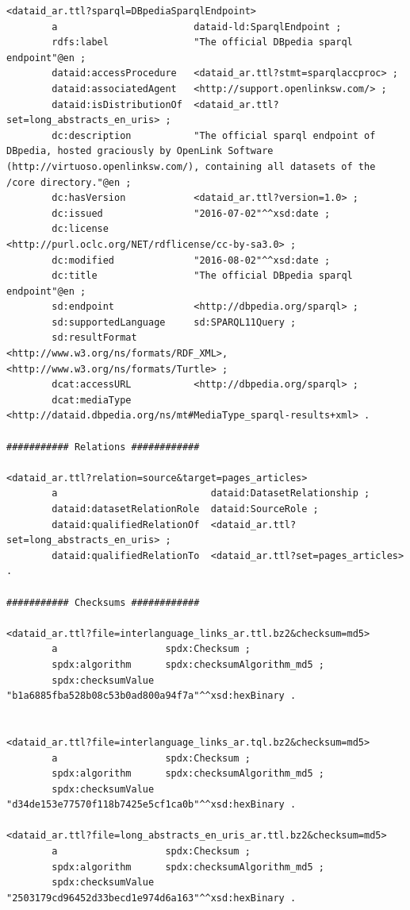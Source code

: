 \documentclass[a4paper,english,twoside,BCOR1.5cm,headsepline,DIV12,appendixprefix,final,12pt]{scrbook}
\begin{document}
\begin{lstlisting}[language=ttl, captionpos=b, label=lst:dcex,linewidth=\columnwidth,breaklines=true,basicstyle=\ttfamily\scriptsize]
<dataid_ar.ttl?sparql=DBpediaSparqlEndpoint>
        a                        dataid-ld:SparqlEndpoint ;
        rdfs:label               "The official DBpedia sparql endpoint"@en ;
        dataid:accessProcedure   <dataid_ar.ttl?stmt=sparqlaccproc> ;
        dataid:associatedAgent   <http://support.openlinksw.com/> ;
        dataid:isDistributionOf  <dataid_ar.ttl?set=long_abstracts_en_uris> ;
        dc:description           "The official sparql endpoint of DBpedia, hosted graciously by OpenLink Software (http://virtuoso.openlinksw.com/), containing all datasets of the /core directory."@en ;
        dc:hasVersion            <dataid_ar.ttl?version=1.0> ;
        dc:issued                "2016-07-02"^^xsd:date ;
        dc:license               <http://purl.oclc.org/NET/rdflicense/cc-by-sa3.0> ;
        dc:modified              "2016-08-02"^^xsd:date ;
        dc:title                 "The official DBpedia sparql endpoint"@en ;
        sd:endpoint				 <http://dbpedia.org/sparql> ;
        sd:supportedLanguage	 sd:SPARQL11Query ;
        sd:resultFormat			 <http://www.w3.org/ns/formats/RDF_XML>, <http://www.w3.org/ns/formats/Turtle> ;
        dcat:accessURL           <http://dbpedia.org/sparql> ;
        dcat:mediaType           <http://dataid.dbpedia.org/ns/mt#MediaType_sparql-results+xml> .
        
########### Relations ############

<dataid_ar.ttl?relation=source&target=pages_articles>
        a                           dataid:DatasetRelationship ;
        dataid:datasetRelationRole  dataid:SourceRole ;
        dataid:qualifiedRelationOf  <dataid_ar.ttl?set=long_abstracts_en_uris> ;
        dataid:qualifiedRelationTo  <dataid_ar.ttl?set=pages_articles> .

########### Checksums ############

<dataid_ar.ttl?file=interlanguage_links_ar.ttl.bz2&checksum=md5>
        a                   spdx:Checksum ;
        spdx:algorithm      spdx:checksumAlgorithm_md5 ;
        spdx:checksumValue  "b1a6885fba528b08c53b0ad800a94f7a"^^xsd:hexBinary .


<dataid_ar.ttl?file=interlanguage_links_ar.tql.bz2&checksum=md5>
        a                   spdx:Checksum ;
        spdx:algorithm      spdx:checksumAlgorithm_md5 ;
        spdx:checksumValue  "d34de153e77570f118b7425e5cf1ca0b"^^xsd:hexBinary .

<dataid_ar.ttl?file=long_abstracts_en_uris_ar.ttl.bz2&checksum=md5>
        a                   spdx:Checksum ;
        spdx:algorithm      spdx:checksumAlgorithm_md5 ;
        spdx:checksumValue  "2503179cd96452d33becd1e974d6a163"^^xsd:hexBinary .


\end{lstlisting}
\end{document}
